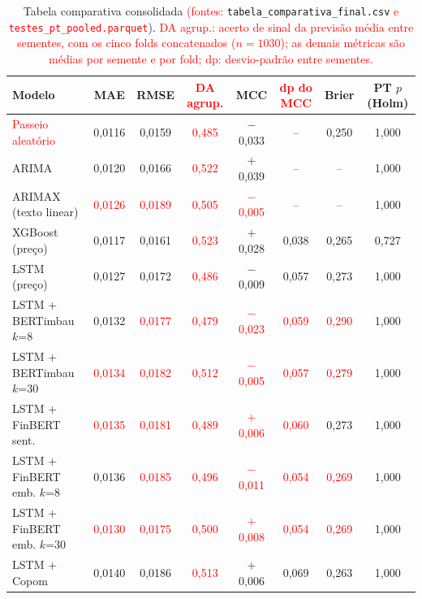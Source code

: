 \documentclass[conference]{IEEEtran}
\newcommand{\novo}[1]{\textcolor{red}{#1}}
\begin{document}
\begin{table}[htbp]
\caption{Tabela comparativa consolidada \novo{(fontes:} \texttt{tabela\_comparativa\_final.csv} \novo{e \texttt{testes\_pt\_pooled.parquet}}). \novo{DA agrup.: acerto de sinal da previs\~ao m\'edia entre sementes, com os cinco folds concatenados ($n=1030$); as demais m\'etricas s\~ao m\'edias por semente e por fold; dp: desvio-padr\~ao entre sementes.}}
\begin{center}
\footnotesize
\begin{tabular}{lccccccc}
\toprule
\textbf{Modelo} & \textbf{MAE} & \textbf{RMSE} & \novo{\textbf{DA agrup.}} & \textbf{MCC} & \novo{\textbf{dp do MCC}} & \textbf{Brier} & \textbf{PT $p$ (Holm)} \\
\midrule
\novo{Passeio aleat\'orio} & 0,0116 & 0,0159 & \novo{0,485} & $-$0,033 & --      & 0,250 & 1,000 \\
ARIMA                   & 0,0120 & 0,0166 & \novo{0,522} & $+$0,039 & --      & --    & 1,000 \\
ARIMAX (texto linear) & \novo{0,0126} & \novo{0,0189} & \novo{0,505} & \novo{$-$0,005} & -- & -- & 1,000 \\
XGBoost (pre\c{c}o)     & 0,0117 & 0,0161 & \novo{0,523} & $+$0,028 & 0,038   & 0,265 & 0,727 \\
LSTM (pre\c{c}o)        & 0,0127 & 0,0172 & \novo{0,486} & $-$0,009 & 0,057   & 0,273 & 1,000 \\
LSTM + BERTimbau $k$=8 & 0,0132 & \novo{0,0177} & \novo{0,479} & \novo{$-$0,023} & \novo{0,059} & \novo{0,290} & 1,000 \\
LSTM + BERTimbau $k$=30 & \novo{0,0134} & \novo{0,0182} & \novo{0,512} & \novo{$-$0,005} & \novo{0,057} & \novo{0,279} & 1,000 \\
LSTM + FinBERT sent. & \novo{0,0135} & \novo{0,0181} & \novo{0,489} & \novo{$+$0,006} & \novo{0,060} & 0,273 & 1,000 \\
LSTM + FinBERT emb. $k$=8 & 0,0136 & \novo{0,0185} & \novo{0,496} & \novo{$-$0,011} & \novo{0,054} & \novo{0,269} & 1,000 \\
LSTM + FinBERT emb. $k$=30 & \novo{0,0130} & \novo{0,0175} & \novo{0,500} & \novo{$+$0,008} & \novo{0,054} & \novo{0,269} & 1,000 \\
LSTM + Copom            & 0,0140 & 0,0186 & \novo{0,513} & $+$0,006 & 0,069   & 0,263 & 1,000 \\
\bottomrule
\end{tabular}
\label{tab:comparativa}
\end{center}
\end{table}
\end{document}
